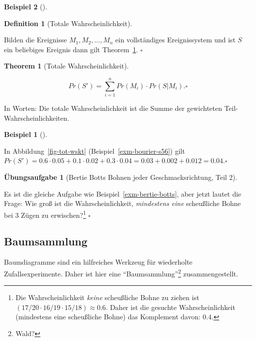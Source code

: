 \documentclass[
  ngerman,
  letterpaper,
  twoside,
  open=any]{scrbook}
\theoremstyle{definition}
\newtheorem{example}{Beispiel}[chapter]
\theoremstyle{plain}
\newtheorem{theorem}{Theorem}[chapter]
\theoremstyle{definition}
\newtheorem{exercise}{Übungsaufgabe}[chapter]
\theoremstyle{definition}
\newtheorem{definition}{Definition}[chapter]
\theoremstyle{remark}
\begin{document}
\begin{example}[]
\begin{definition}[Totale
Wahrscheinlichkeit]\protect\hypertarget{def-totwskt}{}\label{def-totwskt}

Bilden die Ereignisse \(M_1, M_2, ..., M_n\) ein vollständiges
Ereignissystem und ist \(S\) ein beliebiges Ereignis dann gilt
Theorem~\ref{thm-totale-wskt}. \(\square\)

\end{definition}

\begin{theorem}[Totale
Wahrscheinlichkeit]\protect\hypertarget{thm-totale-wskt}{}\label{thm-totale-wskt}

\[Pr(S') = \sum_{i=1}^n Pr(M_i) \cdot Pr(S|M_i).\square\]

\end{theorem}

In Worten: Die totale Wahrscheinlichkeit ist die Summe der gewichteten
Teil-Wahrscheinlichkeiten.

\begin{example}[]\protect\hypertarget{exm-totwskt1}{}\label{exm-totwskt1}

In Abbildung~\ref{fig-tot-wskt} (Beispiel~\ref{exm-bourier-s56}) gilt
\(Pr(S') = 0.6 \cdot 0.05 + 0.1 \cdot 0.02 + 0.3 \cdot 0.04 = 0.03 + 0.002 + 0.012 = 0.04.\square\)

\end{example}

\begin{exercise}[Bertie Botts Bohnen jeder Geschmacksrichtung, Teil
2]\protect\hypertarget{exr-bertie-botts2}{}\label{exr-bertie-botts2}

Es ist die gleiche Aufgabe wie Beispiel~\ref{exm-bertie-botts}, aber
jetzt lautet die Frage: Wie groß ist die Wahrscheinlichkeit,
\emph{mindestens eine} scheußliche Bohne bei 3 Zügen zu
erwischen?\footnote{Die Wahrscheinlichkeit \emph{keine} scheußliche
  Bohne zu ziehen ist \((17/20 \cdot 16/19 \cdot 15/18) \approx 0.6\).
  Daher ist die gesuchte Wahrscheinlichkeit (mindestens eine scheußliche
  Bohne) das Komplement davon: \(0.4\).} \(\square\)

\end{exercise}

\subsection{Baumsammlung}\label{baumsammlung}

Baumdiagramme sind ein hilfreiches Werkzeug für wiederholte
Zufallsexperimente. Daher ist hier eine
\enquote{Baumsammlung}\footnote{Wald?} zusammengestellt.


\end{example}
\end{document}
